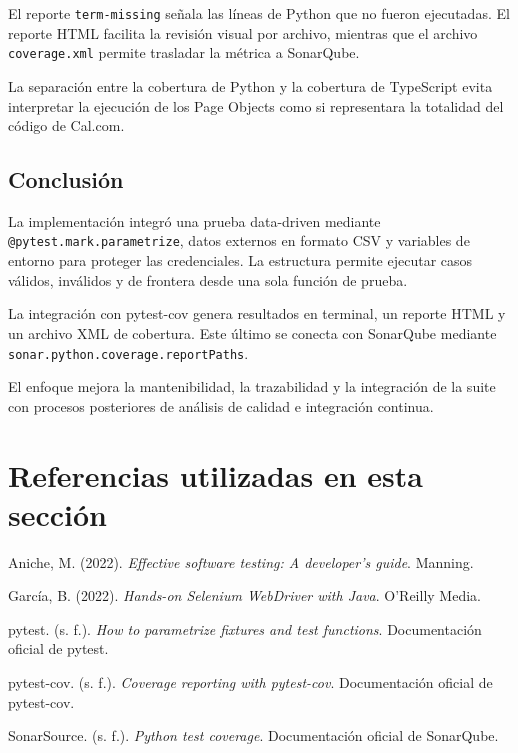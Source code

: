 \documentclass[12pt,letterpaper]{article}
\begin{document}
El reporte \texttt{term-missing} señala las líneas de Python que no fueron ejecutadas. El reporte HTML facilita la revisión visual por archivo, mientras que el archivo \texttt{coverage.xml} permite trasladar la métrica a SonarQube.

La separación entre la cobertura de Python y la cobertura de TypeScript evita interpretar la ejecución de los Page Objects como si representara la totalidad del código de Cal.com.

\subsection{Conclusión}

La implementación integró una prueba data-driven mediante \texttt{@pytest.mark.parametrize}, datos externos en formato CSV y variables de entorno para proteger las credenciales. La estructura permite ejecutar casos válidos, inválidos y de frontera desde una sola función de prueba.

La integración con pytest-cov genera resultados en terminal, un reporte HTML y un archivo XML de cobertura. Este último se conecta con SonarQube mediante \texttt{sonar.python.coverage.reportPaths}.

El enfoque mejora la mantenibilidad, la trazabilidad y la integración de la suite con procesos posteriores de análisis de calidad e integración continua.

\section*{Referencias utilizadas en esta sección}

Aniche, M. (2022). \textit{Effective software testing: A developer's guide}. Manning.

García, B. (2022). \textit{Hands-on Selenium WebDriver with Java}. O'Reilly Media.

pytest. (s. f.). \textit{How to parametrize fixtures and test functions}. Documentación oficial de pytest.

pytest-cov. (s. f.). \textit{Coverage reporting with pytest-cov}. Documentación oficial de pytest-cov.

SonarSource. (s. f.). \textit{Python test coverage}. Documentación oficial de SonarQube.
\end{document}
